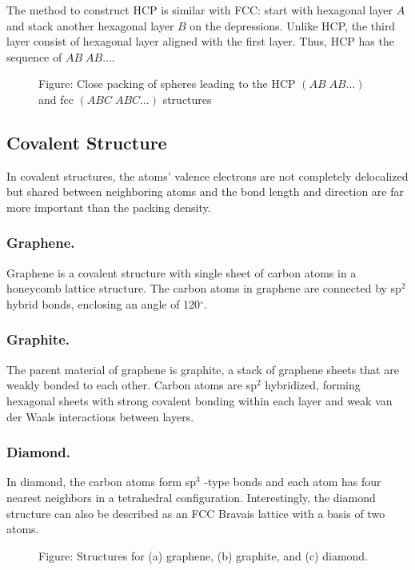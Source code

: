 \documentclass[../../../main.tex]{subfiles}
\begin{document}
The method to construct HCP is similar with FCC: start with hexagonal layer $A$ and stack another hexagonal layer $B$ on the depressions.
Unlike HCP, the third layer consist of hexagonal layer aligned with the first layer.
Thus, HCP has the sequence of $AB\;AB\dots$.

\begin{figure}[]
    \centering
    \caption*{Figure: Close packing of spheres leading to the HCP $(AB\;AB\dots)$ and fcc $(ABC\;ABC\dots)$ structures}
\end{figure}

\subsection{Covalent Structure}
In covalent structures, the atoms’ valence electrons are not completely delocalized but shared between neighboring atoms and the bond length and direction are far more important than the packing density.
\subsubsection{Graphene.}
Graphene is a covalent structure with single sheet of carbon atoms in a honeycomb lattice structure.
The carbon atoms in graphene are connected by sp$^2$ hybrid bonds, enclosing an angle of 120$^\circ$.

\subsubsection{Graphite.}
The parent material of graphene is graphite, a stack of graphene sheets that are weakly bonded to each other.
Carbon atoms are sp$^2$ hybridized, forming hexagonal sheets with strong covalent bonding within each layer and weak van der Waals interactions between layers.

\subsubsection{Diamond.}
In diamond, the carbon atoms form sp$^3$ -type bonds and each atom has four nearest neighbors in a tetrahedral configuration.
Interestingly, the diamond structure can also be described as an FCC Bravais lattice with a basis of two atoms.
\begin{figure}[]
    \centering
    \caption*{Figure: Structures for (a) graphene, (b) graphite, and (c) diamond.}
\end{figure}
\end{document}
